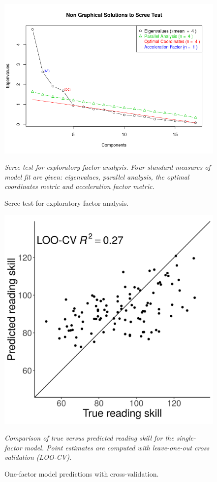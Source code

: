 \documentclass[..\uwthesis.tex]{subfiles}
\begin{document}
\begin{figure}
    \centering
    \caption{Scree test for exploratory factor analysis.}
    \label{fig:suppb_5}
    \includegraphics[width = 12 cm]{images/appendix_b/S5_scree_test.png}
    \item \textit{Scree test for exploratory factor analysis. Four standard measures of model fit are given: eigenvalues, parallel analysis, the optimal coordinates metric and acceleration factor metric.}
\end{figure}

\begin{figure}
    \centering
    \caption{One-factor model predictions with cross-validation.}
    \label{fig:suppb_6}
    \includegraphics[width = 12 cm]{images/appendix_b/S6_DDM_model_1factor.png}
    \item \textit{Comparison of true versus predicted reading skill for the single-factor model. Point estimates are computed with leave-one-out cross validation (LOO-CV). }
\end{figure}
\end{document}
